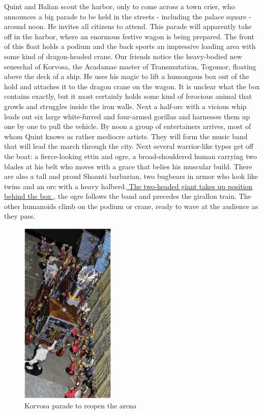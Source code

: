 Quint and Balian scout the harbor, only to come across a town crier, who announces a big parade to be held in the streets - including the palace square - around noon. He invites all citizens to attend. This parade will apparently take off in the harbor, where an enormous festive wagon is being prepared. The front of this float holds a podium and the back sports an impressive loading area with some kind of dragon-headed crane. Our friends notice the heavy-bodied new seneschal of Korvosa, the Acadamae master of Transmutation, Togomor, floating above the deck of a ship. He uses his magic to lift a humongous box out of the hold and attaches it to the dragon crane on the wagon. It is unclear what the box contains exactly, but it most certainly holds some kind of ferocious animal that growls and struggles inside the iron walls. Next a half-orc with a vicious whip leads out six large white-furred and four-armed gorillas and harnesses them up one by one to pull the vehicle. By noon a group of entertainers arrives, most of whom Quint knows as rather mediocre artists. They will form the music band that will lead the march through the city. Next several warrior-like types get off the boat: a fierce-looking ettin and ogre, a broad-shouldered human carrying two blades at his belt who moves with a grace that belies his muscular build. There are also a tall and proud Shoanti barbarian, two bugbears in armor who look like twins and an orc with a heavy halberd.\hyperref[fig:Korvosa-parade-to-reopen-the-arena-613133348]{ The two-headed giant takes up position behind the box } , the ogre follows the band and precedes the girallon train. The other humanoids climb on the podium or crane, ready to wave at the audience as they pass. \\

\begin{figure}[h]
	\centering
	\includegraphics[width=0.4\textwidth]{images/Korvosa-parade-to-reopen-the-arena-613133348_mod.jpg}
	\caption{Korvosa parade to reopen the arena}
	\label{fig:Korvosa-parade-to-reopen-the-arena-613133348}
\end{figure}

